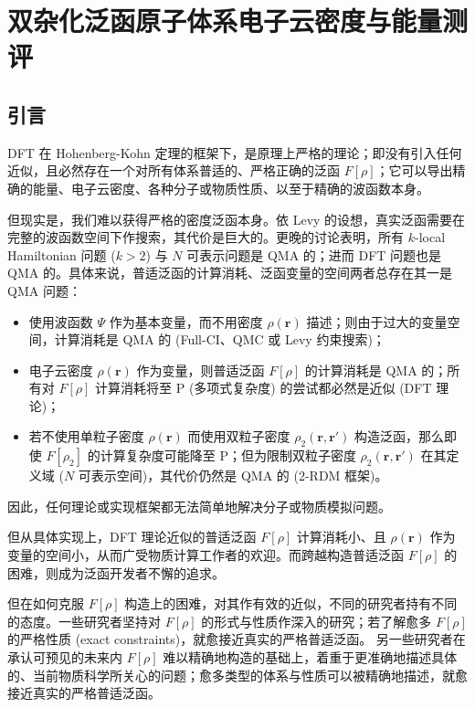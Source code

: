 
\chapter{双杂化泛函原子体系电子云密度与能量测评}

\section{引言}

DFT 在 Hohenberg-Kohn 定理\cite{Hohenberg-Kohn.PR.1964}的框架下，是原理上严格的理论；即没有引入任何近似，且必然存在一个对所有体系普适的、严格正确的泛函 $F[\rho]$；它可以导出精确的能量、电子云密度、各种分子或物质性质、以至于精确的波函数本身。

但现实是，我们难以获得严格的密度泛函本身。依 Levy 的设想\cite{Levy-Levy.PNAS.1979}，真实泛函需要在完整的波函数空间下作搜索，其代价是巨大的。更晚的讨论表明，所有 $k$-local Hamiltonian 问题 ($k > 2$) 与 $N$ 可表示问题是 QMA 的\cite{Kempe-Regev.SJC.2006, Liu-Verstraete.PRL.2007}；进而 DFT 问题也是 QMA 的\cite{Schuch-Verstraete.NP.2009}。具体来说，普适泛函的计算消耗、泛函变量的空间两者总存在其一是 QMA 问题：
\begin{itemize}[nosep]
    \item 使用波函数 $\Psi$ 作为基本变量，而不用密度 $\rho(\bm{r})$ 描述；则由于过大的变量空间，计算消耗是 QMA 的 (Full-CI、QMC 或 Levy 约束搜索)；
    \item 电子云密度 $\rho(\bm{r})$ 作为变量，则普适泛函 $F[\rho]$ 的计算消耗是 QMA 的；所有对 $F[\rho]$ 计算消耗将至 P (多项式复杂度) 的尝试都必然是近似 (DFT 理论)；
    \item 若不使用单粒子密度 $\rho(\bm{r})$ 而使用双粒子密度 $\rho_2(\bm{r}, \bm{r}')$ 构造泛函，那么即使 $F[\rho_2]$ 的计算复杂度可能降至 P；但为限制双粒子密度 $\rho_2 (\bm{r}, \bm{r}')$ 在其定义域 ($N$ 可表示空间)，其代价仍然是 QMA 的 (2-RDM 框架)。
\end{itemize}
因此，任何理论或实现框架都无法简单地解决分子或物质模拟问题。

但从具体实现上，DFT 理论近似的普适泛函 $F[\rho]$ 计算消耗小、且 $\rho(\bm{r})$ 作为变量的空间小，从而广受物质计算工作者的欢迎。而跨越构造普适泛函 $F[\rho]$ 的困难，则成为泛函开发者不懈的追求。

但在如何克服 $F[\rho]$ 构造上的困难，对其作有效的近似，不同的研究者持有不同的态度。一些研究者坚持对 $F[\rho]$ 的形式与性质作深入的研究；若了解愈多 $F[\rho]$ 的严格性质 (exact constraints)，就愈接近真实的严格普适泛函\cite{Kohn-Sham.PR.1965, Slater-Slater.PR.1951, Vosko-Nusair.CJP.1980, Perdew-Ernzerhof.PRL.1996, Adamo-Barone.JCP.1999, Ernzerhof-Scuseria.JCP.1999, Tao-Scuseria.PRL.2003, Cohen-Yang.CR.2012, Su-Xu.JCP.2014, Sun-Perdew.PRL.2015, Medvedev-Lyssenko.S.2017}。
另一些研究者在承认可预见的未来内 $F[\rho]$ 难以精确地构造的基础上，着重于更准确地描述具体的、当前物质科学所关心的问题；愈多类型的体系与性质可以被精确地描述，就愈接近真实的严格普适泛函\cite{Becke-Becke.PRA.1988, Lee-Parr.PRB.1988, Becke-Becke.JCP.1993, Zhao-Truhlar.JCP.2006, Grimme-Grimme.JCP.2006, Zhao-Truhlar.TCA.2008, Zhang-Goddard.PNAS.2009, Chai-Head-Gordon.JCP.2009, Zhang-Goddard.PNAS.2011, Zhang-Xu.JCP.2012, Yu-Truhlar.JCP.2016, Chen-Weinan.JCTC.2021}。

